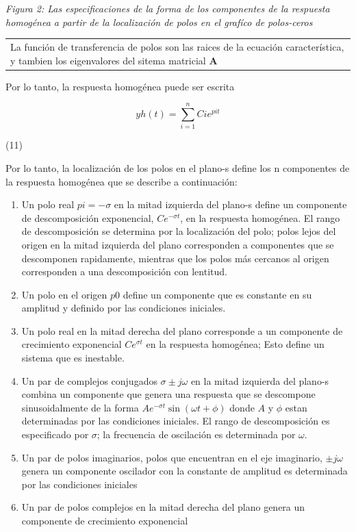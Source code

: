 \documentclass[10pt,a4paper]{article}
\begin{document}
\textit{Figura 2: Las especificaciones de la forma de los componentes de la respuesta homogénea a partir de la localización de polos en el grafíco de polos-ceros}
\begin{center}
  \begin{tabular}{p{14cm}}
    La función de transferencia de polos son las raices de la ecuación característica, y tambien los eigenvalores del sitema matricial $\mathbf{A}$\\
  \end{tabular}
\end{center}
Por lo tanto, la respuesta homogénea puede ser escrita
\begin{center}
  \begin{center}
    \[y{\scriptscriptstyle h}(t)=\sum_{i=1}^n C{\scriptscriptstyle i}e^{p{\scriptscriptstyle i}t}\]
  \end{center}
  \begin{minipage}{0.9\textwidth}
    \begin{flushright}
        (11)
    \end{flushright}
  \end{minipage}
\end{center}
Por lo tanto, la localización de los polos en el plano-s define los n componentes de la respuesta homogénea que se describe a continuación:
\begin{enumerate}
  \item Un polo real $p{\scriptscriptstyle i}=-\sigma$ en la mitad izquierda del plano-s define un componente de descomposición exponencial, $Ce^{-\sigma t}$, en la respuesta homogénea. El rango de descomposición se determina por la localización del polo; polos lejos del origen en la mitad izquierda del plano corresponden a componentes que se descomponen rapidamente, mientras que los polos más cercanos al origen corresponden a una descomposición con lentitud.
  \item Un polo en el origen $p{\scriptscriptstyle 0}$ define un componente que es constante en su amplitud y definido por las condiciones iniciales.
  \item Un polo real en la mitad derecha del plano corresponde a un componente de crecimiento exponencial $Ce^{\sigma t}$ en la respuesta homogénea; Esto define un sistema que es inestable.
  \item Un par de complejos conjugados $\sigma \pm j\omega$ en la mitad izquierda del plano-s combina un componente que genera una respuesta que se descompone sinusoidalmente de la forma $Ae^{-\sigma t}\sin(\omega t + \phi)$ donde $A$ y $\phi$ estan determinadas por las condiciones iniciales. El rango de descomposición es especificado por $\sigma$; la frecuencia de oscilación es determinada por $\omega$.
  \item Un par de polos imaginarios, polos que encuentran en el eje imaginario, $\pm j\omega$ genera un componente oscilador con la constante de amplitud es determinada por las condiciones iniciales
  \item Un par de polos complejos en la mitad derecha del plano genera un componente de crecimiento exponencial
\end{enumerate}
\end{document}
